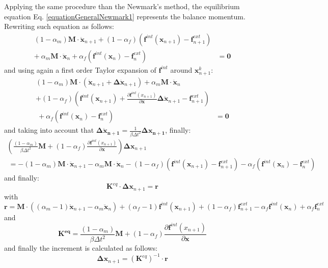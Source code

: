 \documentclass[oneside,11pt,times]{book}
\begin{document}
Applying the same procedure than the Newmark's method, the equilibrium equation Eq. \eqref{equationGeneralNewmark1} represents the balance momentum. Rewriting such equation as follows:
\begin{equation} \label{imple1}
 \begin{split}
 (1 - \alpha_m) \bm{M} \cdot \ddot{\bm{x}}_{n+1} + (1 - \alpha_f) \left(\bm{f}^{int}(\bm{x}_{n+1})- \bm{f}^{ext}_{n+1}\right) & \\ + \: \alpha_m \bm{M} \cdot \ddot{\bm{x}}_{n} + \alpha_f  \left(\bm{f}^{int}(\bm{x}_{n}) - \bm{f}^{ext}_{n}\right) & = \bm{0}
 \end{split}
\end{equation}
and using again a first order Taylor expansion of $\bm{f}^{int}$ around $\bm{x}^{k}_{n+1}$:
\begin{equation} \label{imple2}
 \begin{split}
 (1 - \alpha_m) \bm{M} \cdot (\ddot{\bm{x}}_{n+1}+\bm{\Delta \ddot{x}}_{n+1}) +  \alpha_m \bm{M} \cdot \ddot{\bm{x}}_{n} &\\+ (1 - \alpha_f) \left(\bm{f}^{int}(\bm{x}_{n+1})+ \frac{\partial \bm{f}^{int}(x_{n+1})}{\partial \bm{x}}\bm{\Delta \ddot{x}}_{n+1}- \bm{f}^{ext}_{n+1}\right) & \\ \:  + \alpha_f  \left(\bm{f}^{int}(\bm{x}_{n}) - \bm{f}^{ext}_{n}\right) & = \bm{0}
 \end{split}
\end{equation}
and taking into account that $\bm{\Delta \ddot{x}_{n+1}}=\frac{1}{\beta \Delta t^2}\bm{\Delta x_{n+1}}$, finally:
\begin{equation} \label{imple3}
 \begin{split}
 \left(\frac{(1 - \alpha_m)}{\beta \Delta t^2} \bm{M} + (1 - \alpha_f) \frac{\partial \bm{f}^{int}(x_{n+1})}{\partial \bm{x}}\right)\bm{\Delta x}_{n+1} & \\ \: =  -(1 - \alpha_m) \bm{M} \cdot \ddot{\bm{x}}_{n+1}- \alpha_m \bm{M} \cdot \ddot{\bm{x}}_{n} - (1 - \alpha_f) \left(\bm{f}^{int}(\bm{x}_{n+1}) - \bm{f}^{ext}_{n+1}\right) - \alpha_f  \left(\bm{f}^{int}(\bm{x}_{n}) - \bm{f}^{ext}_{n}\right)
 \end{split}
\end{equation}
and finally:
\begin{equation} \label{imple4}
\bm{K}^{eq}\cdot\bm{\Delta x}_{n+1} =  \bm{r}
\end{equation}
with
\begin{equation} \label{imple5}
\bm{r}= \bm{M} \cdot\left((\alpha_m-1) \ddot{\bm{x}}_{n+1}- \alpha_m \ddot{\bm{x}}_{n}\right) + (\alpha_f-1) \bm{f}^{int}(\bm{x}_{n+1}) + (1-\alpha_f) \bm{f}^{ext}_{n+1} - \alpha_f  \bm{f}^{int}(\bm{x}_{n}) + \alpha_f\bm{f}^{ext}_{n}
\end{equation}
and
\begin{equation} \label{imple6}
 \bm{K^{eq}}=\frac{(1 - \alpha_m)}{\beta \Delta t^2} \bm{M} + (1 - \alpha_f) \frac{\partial \bm{f}^{int}(x_{n+1})}{\partial \bm{x}}
\end{equation}
and finally the increment is calculated as follows:
\begin{equation} \label{imple7}
\bm{\Delta x}_{n+1} =  (\bm{K}^{eq})^{-1}\cdot\bm{r}
\end{equation}
\end{document}
